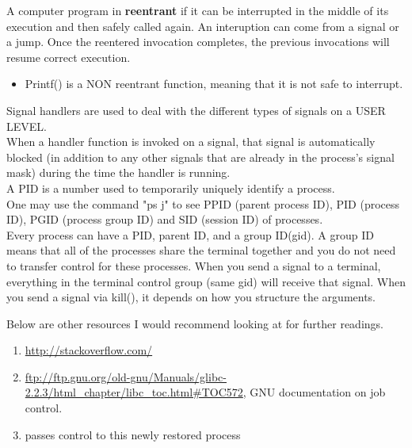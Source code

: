 
A computer program in {\bf reentrant} if it can be interrupted in the middle of its execution and then safely called again.  An interuption can come from a signal or a jump.  Once the reentered invocation completes, the previous invocations will resume correct execution.

\begin{itemize}
\item Printf() is a NON reentrant function, meaning that it is not safe to interrupt.
\end{itemize}

Signal handlers are used to deal with the different types of signals on a USER LEVEL.\\

When a handler function is invoked on a signal, that signal is automatically blocked (in addition to any other signals that are already in the process's signal mask) during the time the handler is running. \\




A PID is a number used to temporarily uniquely identify a process.\\
One may use the command "ps j" to see PPID (parent process ID), PID (process ID), PGID (process group ID) and SID (session ID) of processes.   \\

Every process can have a PID, parent ID, and a group ID(gid).  A group ID means that all of the processes share the terminal together and you do not need to transfer control for these processes.  When you send a signal to a terminal, everything in the terminal control group (same gid) will receive that signal. When you send a signal via kill(), it depends on how you structure the arguments.


Below are other resources I would recommend looking at for further readings.

\begin{enumerate}
\item  \url{http://stackoverflow.com/}
\item \url{ftp://ftp.gnu.org/old-gnu/Manuals/glibc-2.2.3/html_chapter/libc_toc.html#TOC572}, GNU documentation on job control.
\item  passes control to this newly restored process
\end{enumerate}



